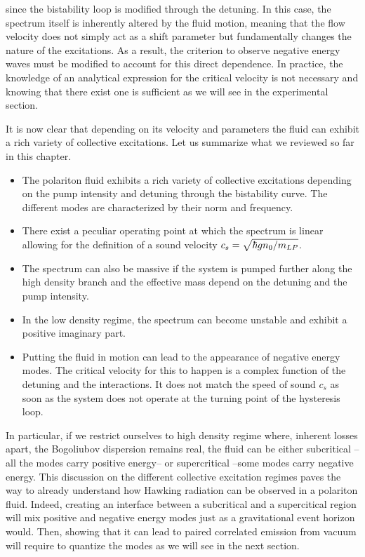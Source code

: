 since the bistability loop is modified through the detuning. In this case, the spectrum itself is inherently altered by the fluid motion, meaning that the flow velocity does not simply act as a shift parameter but fundamentally changes the nature of the excitations.
 As a result, the criterion to observe negative energy waves must be modified to account for this direct dependence. In practice, the knowledge of an analytical 
 expression for the critical velocity is not necessary and knowing that there exist one is sufficient as we will see in the experimental section.
 




\bigskip



It is now clear that depending on its velocity and parameters the fluid can exhibit a rich variety of collective excitations. Let us summarize what we reviewed  so far in this chapter.
\begin{tcolorbox}[infernoSummary]
    \begin{itemize}
        \item The polariton fluid exhibits a rich variety of collective excitations depending on the pump intensity and detuning through the bistability curve. The different 
        modes are characterized by their norm and frequency.
        \item There exist a peculiar operating point at which the spectrum is linear allowing for the definition of a sound velocity $c_s=\sqrt{\hbar g n_0/m_{LP}}$.
        \item The spectrum can also be massive if the system is pumped further along the high density branch and the effective mass depend on the detuning and the pump intensity.
        \item In the low density regime, the spectrum can become unstable and exhibit a positive imaginary part. 
        \item Putting the fluid in motion can lead to the appearance of negative energy modes. The critical velocity for this to happen is a complex function of the detuning and the interactions. It does not 
         match the speed of sound $c_s$ as soon as the system does not operate at the turning point of the hysteresis loop.
    \end{itemize}
    \end{tcolorbox}


In particular, if we restrict ourselves to high density regime where, inherent losses apart, the Bogoliubov dispersion remains real, the fluid can be either subcritical --all the modes carry positive energy-- or supercritical --some modes carry negative energy.
This discussion on the different collective excitation regimes paves the way to already understand how Hawking radiation can be observed in a polariton fluid. Indeed, creating 
an interface between a subcritical and a supercitical region will mix positive and negative energy modes just as a gravitational event horizon would. Then, 
 showing that it can lead to paired correlated emission from vacuum will require to quantize the modes as we will see in the next section.

